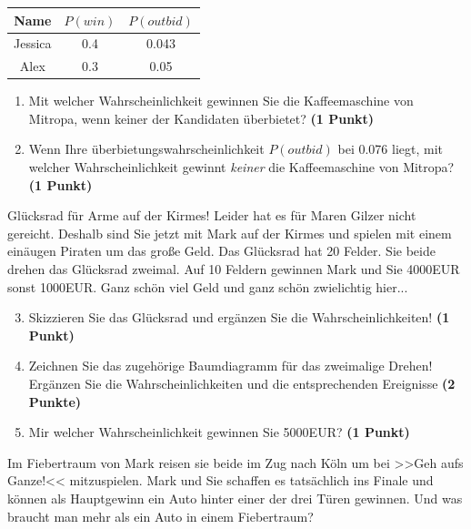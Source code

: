 \documentclass[a4paper, 9pt]{scrartcl}\usepackage[]{graphicx}\usepackage[]{xcolor}
\begin{document}
\begin{center}
\begin{tabular}{ccc}
  \toprule
  Name & $P(win)$ & $P(outbid)$\\
  \midrule
  Jessica & 0.4 & 0.043\\
  Alex & 0.3 & 0.05 \\
  \bottomrule
\end{tabular}
\end{center}

\begin{enumerate}
\item Mit welcher Wahrscheinlichkeit gewinnen Sie die Kaffeemaschine von Mitropa, wenn keiner der Kandidaten überbietet? \textbf{(1 Punkt)}
\item Wenn Ihre überbietungswahrscheinlichkeit $P(outbid)$ bei 0.076 liegt, mit welcher Wahrscheinlichkeit gewinnt \textit{keiner} die Kaffeemaschine von Mitropa? \textbf{(1 Punkt)}
\end{enumerate}

Glücksrad für Arme auf der Kirmes! Leider hat es für Maren Gilzer nicht gereicht. Deshalb sind Sie jetzt mit Mark auf der Kirmes und spielen mit einem einäugen Piraten um das große Geld. Das Glücksrad hat 20 Felder. Sie beide drehen das Glücksrad zweimal. Auf 10 Feldern gewinnen Mark und Sie 4000EUR sonst 1000EUR. Ganz schön viel Geld und ganz schön zwielichtig hier...

\begin{enumerate}
  \setcounter{enumi}{2}  
\item Skizzieren Sie das Glücksrad und ergänzen Sie die Wahrscheinlichkeiten! \textbf{(1 Punkt)}
\item Zeichnen Sie das zugehörige Baumdiagramm für das zweimalige Drehen! Ergänzen Sie die Wahrscheinlichkeiten und die entsprechenden Ereignisse \textbf{(2 Punkte)}
\item Mir welcher Wahrscheinlichkeit gewinnen Sie 5000EUR? \textbf{(1 Punkt)}
\end{enumerate}

Im Fiebertraum von Mark reisen sie beide im Zug nach Köln um bei >>Geh aufs Ganze!<< mitzuspielen. Mark und Sie schaffen es tatsächlich ins Finale und können als Hauptgewinn ein Auto hinter einer der drei Türen gewinnen. Und was braucht man mehr als ein Auto in einem Fiebertraum? 
\end{document}
